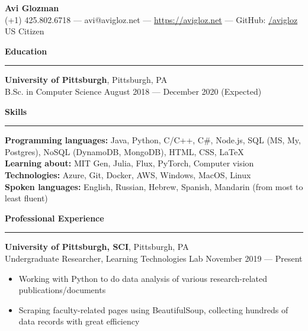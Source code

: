 \documentclass[11pt]{article}
\begin{document}
	\pagestyle{empty}
	\begin{center}
		{\LARGE \textbf{Avi Glozman}}\\
		\vspace{1.25mm}
		{\large (+1) 425.802.6718 --- avi@avigloz.net --- \href{https://avigloz.net}{https://avigloz.net} --- GitHub: \href{https://github.com/avigloz}{/avigloz}}\\
		\vspace{1mm}
		US Citizen
	\end{center}
	
	\begin{flushleft}
		
		\vspace{-1.5mm}
		{\large \raggedright \textbf{Education}}
		\vspace{1.25mm}
	
		\hrule
	
		\vspace{2.25mm}
		\textbf{University of Pittsburgh}, Pittsburgh, PA\\
		{\small B.Sc. in Computer Science \hfill August 2018 --- December 2020 (Expected)}
	
		\vspace{1.5mm}
		{\large \raggedright \textbf{Skills}}
		\vspace{1.25mm}
	
		\hrule
	
		\vspace{2.25mm}
		\textbf{Programming languages:} Java, Python, C/C++, C\#, Node.js, SQL (MS, My, Postgres), NoSQL (DynamoDB, MongoDB), HTML, CSS, \LaTeX\\
		\textbf{Learning about:} MIT Gen, Julia, Flux, PyTorch, Computer vision\\
		\textbf{Technologies:} Azure, Git, Docker, AWS, Windows, MacOS, Linux\\
		\textbf{Spoken languages:} English, Russian, Hebrew, Spanish, Mandarin (from most to least fluent)
		
		\vspace{1.5mm}
		{\large \raggedright \textbf{Professional Experience}}
		\vspace{1.25mm}
	
		\hrule

		\vspace{2.25mm}
		\textbf{University of Pittsburgh, SCI}, Pittsburgh, PA\\
		{\small Undergraduate Researcher, Learning Technologies Lab \hfill November 2019 --- Present}
		\vspace{-1.25mm}
		\begin{itemize}
				\item Working with Python to do data analysis of various research-related publications/documents
				\vspace{-1.5mm}
				\item Scraping faculty-related pages using BeautifulSoup, collecting hundreds of data records with great efficiency
				\vspace{-1.5mm}
		\end{itemize}


\end{flushleft}
\end{document}
